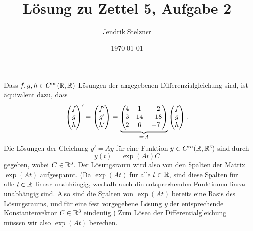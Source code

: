 \documentclass[a4paper, 10pt]{article}
\title{Lösung zu Zettel 5, Aufgabe 2}
\author{Jendrik Stelzner}
\date{\today}
\begin{document}
\maketitle


Dass $f,g,h \in C^\infty(\mathbb{R}, \mathbb{R})$ Lösungen der angegebenen Differenzialgleichung sind, ist äquivalent dazu, dass
\[
    \begin{pmatrix} f \\ g \\ h \end{pmatrix}'
  = \begin{pmatrix} f' \\ g' \\ h' \end{pmatrix}
  =
  \underbrace{
  \begin{pmatrix}
    4 &  1  &  -2 \\
    3 & 14  & -18 \\
    2 &  6  &  -7
  \end{pmatrix}
  }_{\eqqcolon A}
  \begin{pmatrix} f \\ g \\ h \end{pmatrix}.
\]
Die Lösungen der Gleichung $y' = A y$ für eine Funktion $y \in C^\infty(\mathbb{R}, \mathbb{R}^3)$ sind durch
\[
  y(t) = \exp(At) C
\]
gegeben, wobei $C \in \mathbb{R}^3$.
Der Lösungsraum wird also von den Spalten der Matrix $\exp(At)$ aufgespannt.
(Da $\exp(At)$ für alle $t \in \mathbb{R}$, sind diese Spalten für alle $t \in \mathbb{R}$ linear unabhängig, weshalb auch die entsprechenden Funktionen linear unabhängig sind.
Also sind die Spalten von $\exp(At)$ bereits eine Basis des Lösungsraums, und für eine fest vorgegebene Lösung $y$ der entsprechende Konstantenvektor $C \in \mathbb{R}^3$ eindeutig.)
Zum Lösen der Differentialgleichung müssen wir also $\exp(At)$ berechen.
\end{document}

